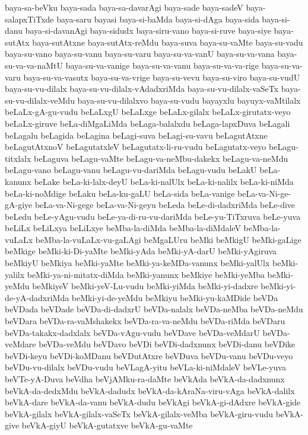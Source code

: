 {baya-sa-beVku
baya-sada
baya-sa-davarAgi
baya-sade
baya-sadeV
baya-salapxTiTxde
baya-saru
bayasi
baya-si-baMda
baya-si-dAga
baya-sida
baya-si-danu
baya-si-davanAgi
baya-sidudx
baya-siru-vano
baya-si-ruve
baya-siye
baya-sutAtx
baya-sutAtxne
baya-sutAtx-reMdu
baya-suva
baya-su-vaMte
baya-su-vadu
baya-su-vano
baya-su-vanu
baya-su-varu
baya-su-va-vanU
baya-su-va-vana
baya-su-va-va-naMtU
baya-su-va-vanige
baya-su-va-vanu
baya-su-va-va-rige
baya-su-va-varu
baya-su-va-vasutx
baya-su-va-vrige
baya-su-vevu
baya-su-viro
baya-su-vudU
baya-su-vu-dilalx
baya-su-vu-dilalx-vAdadxriMda
baya-su-vu-dilalx-vaSeTx
baya-su-vu-dilalx-veMdu
baya-su-vu-dilalxvo
baya-su-vudu
bayayxlu
bayuyx-vaMtilalx
beLaLx-gA-gu-vudu
beLaLxgU
beLaLxge
beLaLx-gilalx
beLaLx-girutatx-veyo
beLaLx-giruve
beLa-diMgaLiMda
beLaga-balalxdu
beLaga-lapxDuva
beLagali
beLagalu
beLagida
beLagina
beLagi-suva
beLagi-su-vavu
beLagutAtxne
beLagutAtxnoV
beLagutatxleV
beLagutatx-li-ru-vudu
beLagutatx-veyo
beLagu-titxlalx
beLaguva
beLagu-vaMte
beLagu-va-neMbu-dakekx
beLagu-va-neMdu
beLagu-vano
beLagu-vanu
beLagu-vu-dariMda
beLagu-vudu
beLakU
beLa-kanunx
beLake
beLa-ki-lalx-deyU
beLa-ki-nalUlx
beLa-ki-nalilx
beLa-ki-niMda
beLa-ki-noMdige
beLaku
beLa-ku-gaLU
beLa-sida
beLa-vanige
beLa-va-Ni-ge-gA-giye
beLa-va-Ni-gege
beLa-va-Ni-geyu
beLeda
beLe-di-dadxriMda
beLe-dive
beLedu
beLe-yAgu-vudu
beLe-ya-di-ru-vu-dariMda
beLe-yu-TiTxruva
beLe-yuva
beLiLx
beLiLxya
beLiLxye
beMba-la-diMda
beMba-la-diMdaleV
beMba-la-vuLaLx
beMba-la-vuLaLx-vu-gaLAgi
beMgaLUru
beMki
beMkigU
beMki-gaLige
beMkige
beMki-ki-Di-yaMte
beMki-yAda
beMki-yA-darU
beMki-yAgiruva
beMkiyU
beMkiya
beMki-yaMte
beMki-ya-keMDa-vanunx
beMki-yalUlx
beMki-yalilx
beMki-ya-ni-mitatx-diMda
beMki-yanunx
beMkiye
beMki-yeMba
beMki-yeMdu
beMkiyeV
beMki-yeV-Lu-vudu
beMki-yiMda
beMki-yi-dadxre
beMki-yi-de-yA-dadxriMda
beMki-yi-de-yeMdu
beMkiyu
beMki-yu-kaMDide
beVDa
beVDada
beVDade
beVDa-di-dadxrU
beVDa-nalalx
beVDa-neMba
beVDa-neMdu
beVDara
beVDa-ra-vaMshakekx
beVDa-ra-va-neMdu
beVDa-riMda
beVDaru
beVDa-takakx-dadxlalx
beVDa-vAgu-vudu
beVDave
beVDa-veMdarU
beVDa-veMdare
beVDa-veMdu
beVDavo
beVDi
beVDi-dadxnunx
beVDi-danu
beVDike
beVDi-keyu
beVDi-koMDanu
beVDutAtxre
beVDuva
beVDu-vanu
beVDu-veyo
beVDu-vu-dilalx
beVDu-vudu
beVLagA-yitu
beVLa-ki-niMdaleV
beVLe-yuva
beVTe-yA-Duva
beVdha
beVjAMku-ra-daMte
beVkAda
beVkA-da-dadxnunx
beVkA-da-dedxMdu
beVkA-dadudx
beVkA-da-kAraNa-viru-vAga
beVkA-dalilx
beVkA-dare
beVkA-da-vanu
beVkA-dudu
beVkAgi
beVkA-gi-dAdxre
beVkA-gide
beVkA-gilalx
beVkA-gilalx-vaSeTx
beVkA-gilalx-veMba
beVkA-giru-vudu
beVkA-give
beVkA-giyU
beVkA-gutatxve
beVkA-gu-vaMte
}
